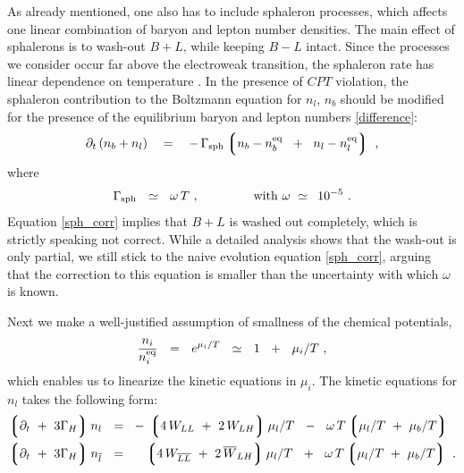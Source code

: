 \documentclass[12pt]{revtex4}
\newcommand{\eq}{{\rm eq}}
\newcommand{\lgr}{\left\lgroup}
\newcommand{\rgr}{\right\rgroup}
\newcommand{\Gsph}{\Gamma_{\rm sph}}
\newcommand{\p}{\partial}
\newcommand{\ov}{\overline}
\begin{document}
	As already mentioned,
	one also has to include sphaleron processes, which affects 
	one linear combination of baryon and lepton number densities.
	The main effect of sphalerons is to wash-out $ B + L $,
	while keeping $ B - L $ intact. 
	Since the processes we consider occur far above the electroweak transition,  the sphaleron rate
has linear
	dependence on temperature 
\cite{Kuzmin:1985mm,Khlebnikov:1988sr}. 
	In the presence of $CPT$ violation, the sphaleron contribution to the Boltzmann equation
	for $ n_l $, $ n_b $ 
\cite{Kuzmin:1985mm,Moore:2000mx,Moore:2000ar} should be modified for the presence of the 
equilibrium baryon and lepton numbers \eqref{difference}:
\begin{equation}
\label{sph_corr}
	\p_t\, (n_b + n_l)
	~~~=~~~ -\, \Gsph 
		\lgr   n_b - n_b^\eq \;~+~\;
		       n_l - n_l^\eq 
		\rgr~,
\end{equation}
	where
\[
	\Gsph ~~\simeq~~ \omega\, T~, \qquad\qquad 
	{\rm ~with~}
	\omega ~\simeq~ \,10^{-5}~.
\]
	Equation \eqref{sph_corr} implies that $ B + L $ is washed out completely,
	which is strictly speaking not correct.
	While a detailed analysis shows 
\cite{Harvey:1990qw}
	that the wash-out is only partial, we still stick to the naive evolution equation
	\eqref{sph_corr}, arguing that the correction to this equation is smaller
	than the uncertainty with which $ \omega $ is known.
	
	Next we make a well-justified assumption of 
	smallness of the chemical potentials,
\[
	\frac{n_i}{n_i^\eq} ~~=~~ e^{\mu_i/T} ~~\simeq~~ 1 ~~+~~ \mu_i/T~,
\]
	which enables us to linearize the kinetic equations in $ \mu_i $.	
The kinetic equations for $ n_l$ takes the following form:
\begin{equation}
\label{kinetic_eqn_prelim}
\begin{split}
	\lgr \p_t ~+~ 3\Gamma_H \rgr
		n_l ~~=~~ & 
	-\, \lgr 4\, W_{LL} ~+~ 2\, W_{L{H}} \rgr  \mu_l/T 
	~~-~~
	\omega\, T \lgr \mu_l/T ~+~ \mu_b/T \rgr 
	\\
	\lgr \p_t ~+~ 3\Gamma_H \rgr
		n_{\ov{l}} ~~=~~ &
	\phantom{-\,}
	\lgr 4\, W_{\ov{LL}} ~+~ 2\, \ov{W}_{L{H}} \rgr  \mu_l/T 
	~~+~~
	\omega\, T \lgr \mu_l/T ~+~ \mu_b/T \rgr ~.
\end{split}
\end{equation}
\end{document}
